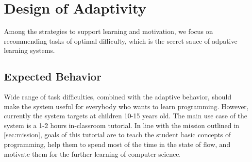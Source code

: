 \chapter{Design of Adaptivity}
\label{chap:design-of-adaptivity}


Among the strategies to support learning and motivation,
we focus on recommending tasks of optimal difficulty,
which is the secret sauce of adpative learning systems.


\section{Expected Behavior}  %
\label{sec:robomission.behavior}



Wide range of task difficulties, combined with the adaptive behavior,
should make the system useful for everybody who wants to learn programming.
However, %
currently the system targets at children 10-15 years old.
The main use case of the system is a 1-2 hours in-classroom tutorial.
In line with the mission outlined in \cref{sec:mission}, goals of this tutorial
are to teach the student basic concepts of programming,
help them to spend most of the time in the state of flow,
and motivate them for the further learning of computer science.

